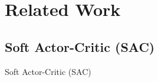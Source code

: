 \chapter{Related Work}
\label{c:related}












\cite{AdaptivePortfolioTradingSystem}
\section{Soft Actor-Critic (SAC)}
Soft Actor-Critic (SAC)\cite{haarnoja2018soft}

